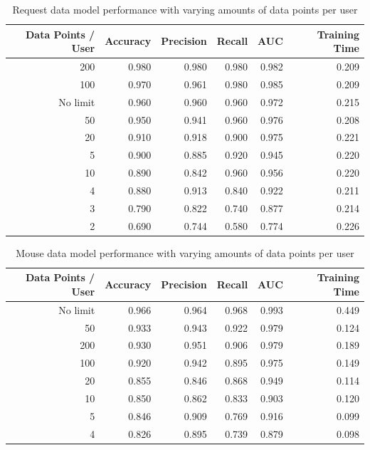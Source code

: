 \documentclass[
    fontsize=12pt,
    headings=small,
    parskip=half,           %
    bibliography=totoc,
    numbers=noenddot,       %
    open=any,               %
    final,                   %
    table
]{scrreprt}
\begin{document}
\begin{table}[H]
    \begin{center}
        \begin{tabular}{rrrrrr}
            \toprule
            Data Points / User & Accuracy & Precision & Recall & AUC & Training Time \\
            \midrule
            200 & 0.980 & 0.980 & 0.980 & 0.982 & 0.209 \\
            100 & 0.970 & 0.961 & 0.980 & 0.985 & 0.209 \\
            No limit & 0.960 & 0.960 & 0.960 & 0.972 & 0.215 \\
            50 & 0.950 & 0.941 & 0.960 & 0.976 & 0.208 \\
            20 & 0.910 & 0.918 & 0.900 & 0.975 & 0.221 \\
            5 & 0.900 & 0.885 & 0.920 & 0.945 & 0.220 \\
            10 & 0.890 & 0.842 & 0.960 & 0.956 & 0.220 \\
            4 & 0.880 & 0.913 & 0.840 & 0.922 & 0.211 \\
            3 & 0.790 & 0.822 & 0.740 & 0.877 & 0.214 \\
            2 & 0.690 & 0.744 & 0.580 & 0.774 & 0.226 \\
            \bottomrule
        \end{tabular}
    \end{center}
    \caption{Request data model performance with varying amounts of data points per user}
    \label{table:request_params_no_limit}
\end{table}


\begin{table}[H]
    \begin{center}
        \begin{tabular}{rrrrrr}
            \toprule
            Data Points / User & Accuracy & Precision & Recall & AUC & Training Time \\
            \midrule
            No limit & 0.966 & 0.964 & 0.968 & 0.993 & 0.449 \\
            50 & 0.933 & 0.943 & 0.922 & 0.979 & 0.124 \\
            200 & 0.930 & 0.951 & 0.906 & 0.979 & 0.189 \\
            100 & 0.920 & 0.942 & 0.895 & 0.975 & 0.149 \\
            20 & 0.855 & 0.846 & 0.868 & 0.949 & 0.114 \\
            10 & 0.850 & 0.862 & 0.833 & 0.903 & 0.120 \\
            5 & 0.846 & 0.909 & 0.769 & 0.916 & 0.099 \\
            4 & 0.826 & 0.895 & 0.739 & 0.879 & 0.098 \\
            \bottomrule
        \end{tabular}
    \end{center}
    \caption{Mouse data model performance with varying amounts of data points per user}
    \label{table:mouse_params_no_limit}
\end{table}
\end{document}
